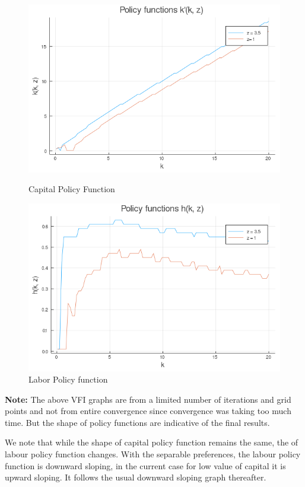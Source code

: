\documentclass[12pt]{article}
\begin{document}
\begin{figure}[h]
    \centering
    \begin{minipage}{0.45\textwidth}
        \centering
        \includegraphics[width=1.2\textwidth]{cap_policy_3_b.png} %
        \caption{Capital Policy Function}
    \end{minipage}\hfill
    \begin{minipage}{0.45\textwidth}
        \centering
        \includegraphics[width=1.2\textwidth]{lab_policy_3_b.png} %
        \caption{Labor Policy function}
    \end{minipage}
\end{figure}


\textbf{Note:} The above VFI graphs are from a limited number of iterations and grid points and not from entire convergence since convergence was taking too much time. But the shape of policy functions are indicative of the final results.

We note that while the shape of capital policy function remains the same, the of labour policy function changes. With the separable preferences, the labour policy function is downward sloping, in the current case for low value of capital it is upward sloping. It follows the usual downward sloping graph thereafter.

%
\end{document}
